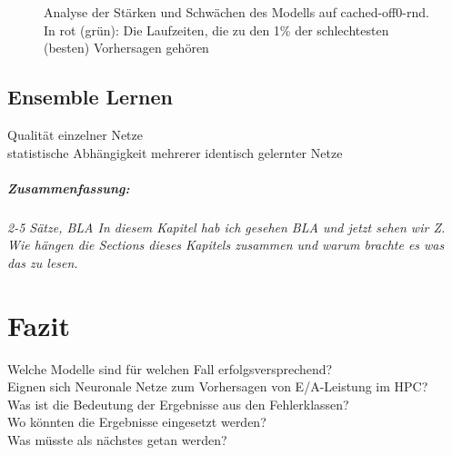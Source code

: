 \documentclass[
	12pt,
	a4paper,
	BCOR10mm,
	DIV14,
	listof=totoc,
	bibliography=totoc,
	headsepline
]{scrreprt}
\begin{document}
\begin{figure}
	\centering
	\caption{Analyse der Stärken und Schwächen des Modells auf cached-off0-rnd. In rot (grün): Die Laufzeiten, die zu den 1\% der schlechtesten (besten) Vorhersagen gehören}
	\label{fig:tupel2_biggest_smallest_rnd}
\end{figure} 

\clearpage

\section{Ensemble Lernen}
Qualität einzelner Netze\\
statistische Abhängigkeit mehrerer identisch gelernter Netze

\paragraph{Zusammenfassung:}
\textit{2-5 Sätze, BLA In diesem Kapitel hab ich gesehen BLA und jetzt sehen wir Z. Wie hängen die Sections dieses Kapitels zusammen und warum brachte es was das zu lesen.}

\chapter{Fazit}
\label{Fazit}
Welche Modelle sind für welchen Fall erfolgsversprechend?\\
Eignen sich Neuronale Netze zum Vorhersagen von E/A-Leistung im HPC?\\
Was ist die Bedeutung der Ergebnisse aus den Fehlerklassen?\\
Wo könnten die Ergebnisse eingesetzt werden?\\
Was müsste als nächstes getan werden?\\
\end{document}
